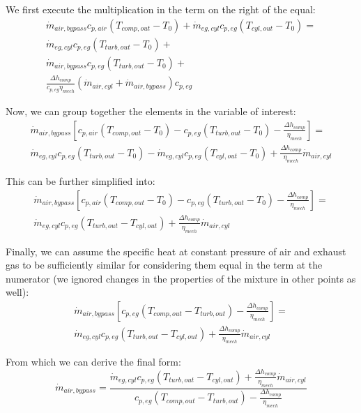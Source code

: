 \documentclass[]{article}
\begin{document}
We first execute the multiplication in the term on the right of the equal:
\begin{multline}
\dot{m}_{air,bypass} c_{p,air} (T_{comp,out} - T_0) + \dot{m}_{eg,cyl} c_{p,eg}  (T_{cyl,out} - T_0)  =  \\
\dot{m}_{eg,cyl} c_{p,eg} (T_{turb,out} - T_0) + \\
\dot{m}_{air,bypass} c_{p,eg} (T_{turb,out} - T_0) + \\ 
\frac{\Delta h_{comp}}{c_{p,eg} \eta_{mech}}(\dot{m}_{air,cyl} + \dot{m}_{air,bypass}) c_{p,eg}
\end{multline}

Now, we can group together the elements in the variable of interest:
\begin{multline}
\dot{m}_{air,bypass} \left[ c_{p,air} (T_{comp,out} - T_0) - c_{p,eg} (T_{turb,out} - T_0) - \frac{\Delta h_{comp}}{\eta_{mech}} \right] = \\
\dot{m}_{eg,cyl} c_{p,eg} (T_{turb,out} - T_0) - \dot{m}_{eg,cyl} c_{p,eg}  (T_{cyl,out} - T_0) + \frac{\Delta h_{comp}}{\eta_{mech}}\dot{m}_{air,cyl}
\end{multline}

This can be further simplified into:
\begin{multline}
\dot{m}_{air,bypass} \left[ c_{p,air} (T_{comp,out} - T_0) - c_{p,eg} (T_{turb,out} - T_0) - \frac{\Delta h_{comp}}{\eta_{mech}} \right] = \\
\dot{m}_{eg,cyl} c_{p,eg} (T_{turb,out} - T_{cyl,out}) + \frac{\Delta h_{comp}}{\eta_{mech}}\dot{m}_{air,cyl}
\end{multline}

Finally, we can assume the specific heat at constant pressure of air and exhaust gas to be sufficiently similar for considering them equal in the term at the numerator (we ignored changes in the properties of the mixture in other points as well):
\begin{multline}
\dot{m}_{air,bypass} \left[ c_{p,eg} (T_{comp,out} - T_{turb,out}) - \frac{\Delta h_{comp}}{\eta_{mech}} \right] = \\
\dot{m}_{eg,cyl} c_{p,eg} (T_{turb,out} - T_{cyl,out}) + \frac{\Delta h_{comp}}{\eta_{mech}}\dot{m}_{air,cyl}
\end{multline}

From which we can derive the final form:
\begin{equation}
\dot{m}_{air,bypass} = \frac{\dot{m}_{eg,cyl} c_{p,eg} (T_{turb,out} - T_{cyl,out}) + \frac{\Delta h_{comp}}{\eta_{mech}}\dot{m}_{air,cyl}}{c_{p,eg} (T_{comp,out} - T_{turb,out}) - \frac{\Delta h_{comp}}{\eta_{mech}}} 
\end{equation}
\end{document}
